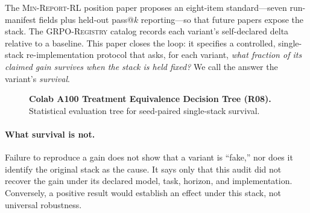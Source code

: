 \documentclass[11pt]{article}
\newcommand{\minreport}{\textsc{Min-Report-RL}}
\newcommand{\grpoReg}{\textsc{GRPO-Registry}}
\begin{document}
The \minreport{} position paper \cite{minreportrl2026} proposes an eight-item
standard---seven run-manifest fields plus held-out pass@$k$ reporting---so that future papers expose the
stack. The \grpoReg{} catalog \cite{grpoRegistry2026} records each variant's
self-declared delta relative to a baseline. This paper closes the loop: it
specifies a controlled, single-stack re-implementation protocol that asks,
for each variant, \emph{what fraction of its claimed gain survives when the
stack is held fixed?} We call the answer the variant's \emph{survival}.

\begin{figure}[htbp]
\centering
{}
\caption{\textbf{Colab A100 Treatment Equivalence Decision Tree (R08).} Statistical evaluation tree for seed-paired single-stack survival.}
\label{fig:reproducibility_treatment_matrix}
\end{figure}

\paragraph{What survival is not.} Failure to reproduce a gain does not show
that a variant is ``fake,'' nor does it identify the original stack as the
cause. It says only that this audit did not recover the gain under its declared
model, task, horizon, and implementation. Conversely, a positive result would
establish an effect under this stack, not universal robustness.
\end{document}
